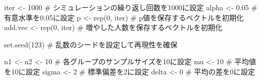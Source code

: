 \documentclass[
  a4paper,
]{ltjsbook}
\newenvironment{Shaded}{\begin{snugshade}}{\end{snugshade}}
\newcommand{\CommentTok}[1]{\textcolor[rgb]{0.37,0.37,0.37}{#1}}
\newcommand{\DecValTok}[1]{\textcolor[rgb]{0.68,0.00,0.00}{#1}}
\newcommand{\FloatTok}[1]{\textcolor[rgb]{0.68,0.00,0.00}{#1}}
\newcommand{\FunctionTok}[1]{\textcolor[rgb]{0.28,0.35,0.67}{#1}}
\newcommand{\NormalTok}[1]{\textcolor[rgb]{0.00,0.23,0.31}{#1}}
\newcommand{\OtherTok}[1]{\textcolor[rgb]{0.00,0.23,0.31}{#1}}
\begin{document}
\begin{Shaded}
\begin{Highlighting}[]
\NormalTok{iter }\OtherTok{\textless{}{-}} \DecValTok{1000} \CommentTok{\# シミュレーションの繰り返し回数を1000に設定}
\NormalTok{alpha }\OtherTok{\textless{}{-}} \FloatTok{0.05} \CommentTok{\# 有意水準を0.05に設定}
\NormalTok{p }\OtherTok{\textless{}{-}} \FunctionTok{rep}\NormalTok{(}\DecValTok{0}\NormalTok{, iter) }\CommentTok{\# p値を保存するベクトルを初期化}
\NormalTok{add.vec }\OtherTok{\textless{}{-}} \FunctionTok{rep}\NormalTok{(}\DecValTok{0}\NormalTok{, iter) }\CommentTok{\# 増やした人数を保存するベクトルを初期化}

\FunctionTok{set.seed}\NormalTok{(}\DecValTok{123}\NormalTok{) }\CommentTok{\# 乱数のシードを設定して再現性を確保}

\NormalTok{n1 }\OtherTok{\textless{}{-}}\NormalTok{ n2 }\OtherTok{\textless{}{-}} \DecValTok{10} \CommentTok{\# 各グループのサンプルサイズを10に設定}
\NormalTok{mu }\OtherTok{\textless{}{-}} \DecValTok{10} \CommentTok{\# 平均値を10に設定}
\NormalTok{sigma }\OtherTok{\textless{}{-}} \DecValTok{2} \CommentTok{\# 標準偏差を2に設定}
\NormalTok{delta }\OtherTok{\textless{}{-}} \DecValTok{0} \CommentTok{\# 平均の差を0に設定}


\end{Highlighting}
\end{Shaded}
\end{document}
